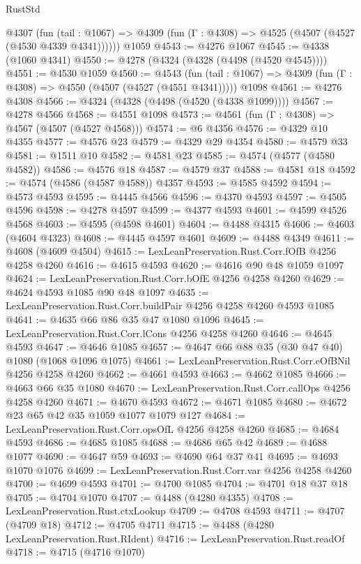 \begin{lexlean}{RustStd}
\begin{coremodule}
    @4307
      (fun (tail : @1067) => @4309 (fun (Γ : @4308) => @4525 (@4507 (@4527 (@4530 @4339 @4341))))))
    @1059
@4543 := @4276 @1067
@4545 := @4338 (@1060 @4341)
@4550 := @4278 (@4324 (@4328 (@4498 (@4520 @4545))))
@4551 := @4530 @1059
@4560 := @4543
    (fun (tail : @1067) => @4309 (fun (Γ : @4308) => @4550 (@4507 (@4527 (@4551 @4341)))))
    @1098
@4561 := @4276 @4308
@4566 := @4324 (@4328 (@4498 (@4520 (@4338 @1099))))
@4567 := @4278 @4566
@4568 := @4551 @1098
@4573 := @4561 (fun (Γ : @4308) => @4567 (@4507 (@4527 @4568)))
@4574 := @6 @4356
@4576 := @4329 @10 @4355
@4577 := @4576 @23
@4579 := @4329 @29 @4354
@4580 := @4579 @33
@4581 := @1511 @10
@4582 := @4581 @23
@4585 := @4574 (@4577 (@4580 @4582))
@4586 := @4576 @18
@4587 := @4579 @37
@4588 := @4581 @18
@4592 := @4574 (@4586 (@4587 @4588)) @4357
@4593 := @4585 @4592
@4594 := @4573 @4593
@4595 := @4445 @4566
@4596 := @4370 @4593
@4597 := @4505 @4596
@4598 := @4278 @4597
@4599 := @4377 @4593
@4601 := @4599 @4526 @4568
@4603 := @4595 (@4598 @4601)
@4604 := @4488 @4315
@4606 := @4603 (@4604 @4323)
@4608 := @4445 @4597 @4601
@4609 := @4488 @4349
@4611 := @4608 (@4609 @4504)
@4615 := LexLeanPreservation.Rust.Corr.fOfB @4256 @4258 @4260
@4616 := @4615 @4593
@4620 := @4616 @90 @48 @1059 @1097
@4624 := LexLeanPreservation.Rust.Corr.bOfE @4256 @4258 @4260
@4629 := @4624 @4593 @1085 @90 @48 @1097
@4635 := LexLeanPreservation.Rust.Corr.buildPair @4256 @4258 @4260 @4593 @1085
@4641 := @4635 @66 @86 @35 @47 @1080 @1096
@4645 := LexLeanPreservation.Rust.Corr.lCons @4256 @4258 @4260
@4646 := @4645 @4593
@4647 := @4646 @1085
@4657 := @4647 @66 @88 @35 (@30 @47 @40) @1080 (@1068 @1096 @1075)
@4661 := LexLeanPreservation.Rust.Corr.eOfBNil @4256 @4258 @4260
@4662 := @4661 @4593
@4663 := @4662 @1085
@4666 := @4663 @66 @35 @1080
@4670 := LexLeanPreservation.Rust.Corr.callOps @4256 @4258 @4260
@4671 := @4670 @4593
@4672 := @4671 @1085
@4680 := @4672 @23 @65 @42 @35 @1059 @1077 @1079 @127
@4684 := LexLeanPreservation.Rust.Corr.opsOfL @4256 @4258 @4260
@4685 := @4684 @4593
@4686 := @4685 @1085
@4688 := @4686 @65 @42
@4689 := @4688 @1077
@4690 := @4647 @59
@4693 := @4690 @64 @37 @41
@4695 := @4693 @1070 @1076
@4699 := LexLeanPreservation.Rust.Corr.var @4256 @4258 @4260
@4700 := @4699 @4593
@4701 := @4700 @1085
@4704 := @4701 @18 @37 @18
@4705 := @4704 @1070
@4707 := @4488 (@4280 @4355)
@4708 := LexLeanPreservation.Rust.ctxLookup
@4709 := @4708 @4593
@4711 := @4707 (@4709 @18)
@4712 := @4705 @4711
@4715 := @4488 (@4280 LexLeanPreservation.Rust.RIdent)
@4716 := LexLeanPreservation.Rust.readOf
@4718 := @4715 (@4716 @1070)

\end{coremodule}
\end{lexlean}
